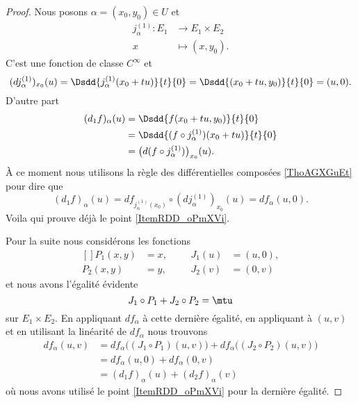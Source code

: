 \begin{proof}
    Nous posons \( \alpha=(x_0,y_0)\in U\) et
    \begin{equation}
        \begin{aligned}
            j_{\alpha}^{(1)}\colon E_1&\to E_1\times E_2 \\
            x&\mapsto (x,y_0). 
        \end{aligned}
    \end{equation}
    C'est une fonction de classe \(  C^{\infty}\) et 
    \begin{equation}
        (dj_{\alpha}^{(1)})_{x_0}(u)=\Dsdd{ j_{\alpha}^{(1)}(x_0+tu) }{t}{0}=\Dsdd{ (x_0+tu,y_0) }{t}{0}=(u,0).
    \end{equation}
    D'autre part 
    \begin{subequations}
        \begin{align}
            (d_1f)_{\alpha}(u)&=\Dsdd{ f(x_0+tu,y_0) }{t}{0}\\
            &=\Dsdd{ (f\circ j_{\alpha}^{(1)})(x_0+tu) }{t}{0}\\
            &=\big( d(f\circ j_{\alpha}^{(1)}) \big)_{x_0}(u).
        \end{align}
    \end{subequations}
    À ce moment nous utilisons la règle des différentielles composées \ref{ThoAGXGuEt} pour dire que
    \begin{equation}
        (d_1f)_{\alpha}(u)=df_{j_{\alpha}^{(1)}(x_0)}\circ (dj_{\alpha}^{(1)})_{x_0}(u)=df_{\alpha}(u,0).
    \end{equation}
    Voila qui prouve déjà le point \ref{ItemRDD_oPmXVi}.

    Pour la suite nous considérons les fonctions 
    \begin{equation}
        \begin{aligned}[]
            P_1(x,y)&=x,&&&J_1(u)&=(u,0),\\
            P_2(x,y)&=y,&&&J_2(v)&=(0,v)
        \end{aligned}
    \end{equation}
    et nous avons l'égalité évidente
    \begin{equation}
        J_1\circ P_1+J_2\circ P_2=\mtu
    \end{equation}
    sur \( E_1\times E_2\). En appliquant \( df_{\alpha}\) à cette dernière égalité, en appliquant à \( (u,v)\) et en utilisant la linéarité de \( df_{\alpha}\) nous trouvons
    \begin{subequations}
        \begin{align}
            df_{\alpha}(u,v)&=df_{\alpha}\big( (J_1\circ P_1)(u,v) \big)+df_{\alpha}\big( (J_2\circ P_2)(u,v) \big)\\
            &=df_{\alpha}(u,0)+df_{\alpha}(0,v)\\
            &=(d_1f)_{\alpha}(u)+(d_2f)_{\alpha}(v)
        \end{align}
    \end{subequations}
    où nous avons utilisé le point \ref{ItemRDD_oPmXVi} pour la dernière égalité.
\end{proof}
